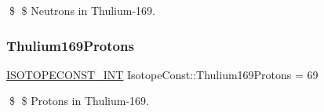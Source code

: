\$ \$ Neutrons in Thulium-\/169. \mbox{\label{group___isotope_const-_thulium-_tm169_ga7e3c46316d472bce02cf91c1ae4e4833}} 
\subsubsection{\texorpdfstring{Thulium169\+Protons}{Thulium169Protons}}
{\footnotesize\ttfamily \mbox{\hyperlink{group___isotope_const-_macros_ga5f18360b3e99483a35c32d789e62621c}{I\+S\+O\+T\+O\+P\+E\+C\+O\+N\+S\+T\+\_\+\+I\+NT}} Isotope\+Const\+::\+Thulium169\+Protons = 69}

\$ \$ Protons in Thulium-\/169. 